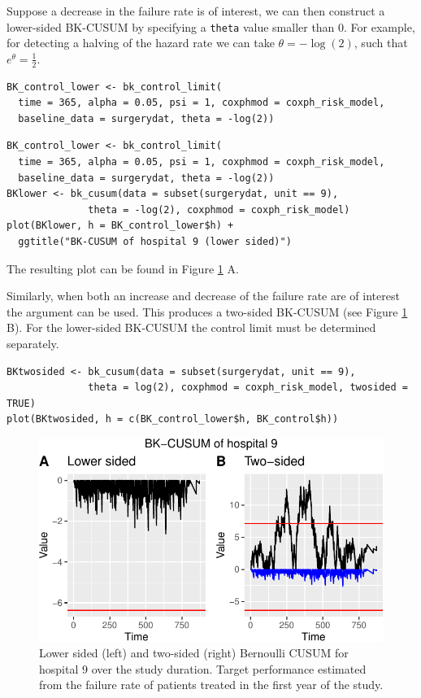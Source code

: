 Suppose a decrease in the failure rate is of interest, we can then construct a lower-sided BK-CUSUM by specifying a \texttt{theta} value smaller than \(0\). For example, for detecting a halving of the hazard rate we can take \(\theta = - \log(2)\), such that \(e^\theta = \frac{1}{2}\).

\begin{verbatim}
BK_control_lower <- bk_control_limit(
  time = 365, alpha = 0.05, psi = 1, coxphmod = coxph_risk_model,
  baseline_data = surgerydat, theta = -log(2))
\end{verbatim}

\begin{verbatim}
BK_control_lower <- bk_control_limit(
  time = 365, alpha = 0.05, psi = 1, coxphmod = coxph_risk_model,
  baseline_data = surgerydat, theta = -log(2))
BKlower <- bk_cusum(data = subset(surgerydat, unit == 9), 
              theta = -log(2), coxphmod = coxph_risk_model)
plot(BKlower, h = BK_control_lower$h) + 
  ggtitle("BK-CUSUM of hospital 9 (lower sided)")
\end{verbatim}

The resulting plot can be found in Figure \ref{fig:bkupperlower} A.

Similarly, when both an increase and decrease of the failure rate are of interest the argument  can be used. This produces a two-sided BK-CUSUM (see Figure \ref{fig:bkupperlower} B). For the lower-sided BK-CUSUM the control limit must be determined separately.

\begin{verbatim}
BKtwosided <- bk_cusum(data = subset(surgerydat, unit == 9), 
              theta = log(2), coxphmod = coxph_risk_model, twosided = TRUE)
plot(BKtwosided, h = c(BK_control_lower$h, BK_control$h))
\end{verbatim}

\begin{figure}
\centering
\includegraphics{RJ-2023-095_files/figure-latex/bkupperlower-1.pdf}
\caption{\label{fig:bkupperlower}Lower sided (left) and two-sided (right) Bernoulli CUSUM for hospital 9 over the study duration. Target performance estimated from the failure rate of patients treated in the first year of the study.}
\end{figure}

